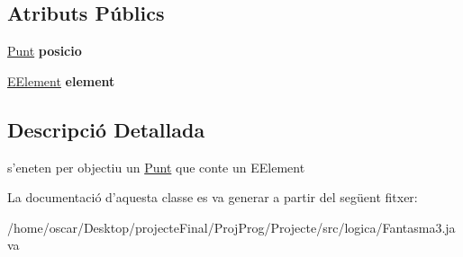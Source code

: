 \subsection*{Atributs Públics}
\begin{DoxyCompactItemize}
\item 
\hypertarget{classlogica_1_1_fantasma3_1_1_objectiu_a4afc64b0a7141a7b688a256b815530e2}{\hyperlink{classlogica_1_1_punt}{Punt} {\bfseries posicio}}\label{classlogica_1_1_fantasma3_1_1_objectiu_a4afc64b0a7141a7b688a256b815530e2}

\item 
\hypertarget{classlogica_1_1_fantasma3_1_1_objectiu_ad3a69f43424fb7bef6057143f32da5d3}{\hyperlink{enumlogica_1_1enumeracions_1_1_e_element}{E\+Element} {\bfseries element}}\label{classlogica_1_1_fantasma3_1_1_objectiu_ad3a69f43424fb7bef6057143f32da5d3}

\end{DoxyCompactItemize}


\subsection{Descripció Detallada}
s'eneten per objectiu un \hyperlink{classlogica_1_1_punt}{Punt} que conte un E\+Element 

La documentació d'aquesta classe es va generar a partir del següent fitxer\+:\begin{DoxyCompactItemize}
\item 
/home/oscar/\+Desktop/projecte\+Final/\+Proj\+Prog/\+Projecte/src/logica/Fantasma3.\+java\end{DoxyCompactItemize}
